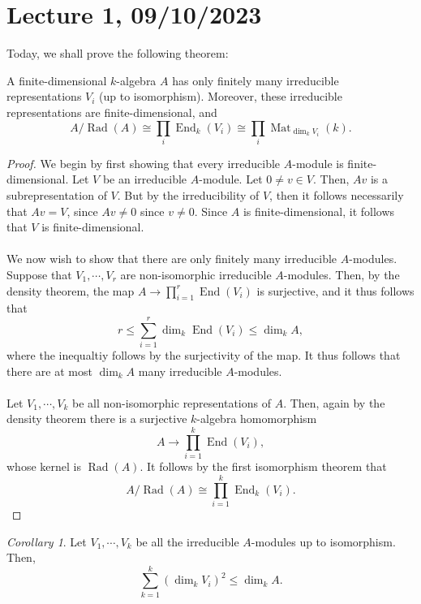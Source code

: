 \documentclass[a4paper]{report}
\theoremstyle{definition}
\theoremstyle{remark}
\theoremstyle{proposition}
\theoremstyle{conjecture}
\theoremstyle{lemma}
\theoremstyle{corollary}
\newtheorem{corollary}{Corollary}
\theoremstyle{exercise}
\theoremstyle{example}
\newcommand{\on}{\operatorname}
\begin{document}
\section{Lecture 1, 09/10/2023}

Today, we shall prove the following theorem:

\begin{theorem}\label{thm25}
    A finite-dimensional $k$-algebra $A$ has only finitely many 
    irreducible representations $V_i$ (up to isomorphism).
    Moreover, these irreducible representations are finite-dimensional,
    and $$A/\on{Rad}(A) \cong \prod_i \on{End}_k(V_i) \cong \prod_i \on{Mat}_{\dim_k V_i}(k).$$
\end{theorem}

\begin{proof}
    We begin by first showing that every irreducible $A$-module is 
    finite-dimensional. Let $V$ be an irreducible $A$-module. 
    Let $0\neq v \in V$. Then, $Av$ is a subrepresentation of 
    $V$. But by the irreducibility of $V$, then it follows necessarily
    that $Av=V$, since $Av\neq 0$ since $v\neq 0$. Since $A$ is 
    finite-dimensional, it follows that $V$ is finite-dimensional. \\\\
    We now wish to show that there are only finitely many irreducible 
    $A$-modules. Suppose that $V_1,\cdots,V_r$ are 
    non-isomorphic irreducible $A$-modules. Then, by the density theorem, 
    the map $A \to \prod_{i=1}^r \on{End}(V_i)$ is surjective, 
    and it thus follows that $$r \leq \sum_{i=1}^r \dim_k \on{End}(V_i)\leq \dim_kA,$$
    where the inequaltiy follows by the surjectivity of the map. It thus 
    follows that there are at most $\dim_kA$ many irreducible $A$-modules.\\\\
    Let $V_1,\cdots,V_k$ be all non-isomorphic representations of $A$.
    Then, again by the density theorem there is a surjective $k$-algebra 
    homomorphism
    $$A \longrightarrow \prod_{i=1}^k \on{End}(V_i),$$
    whose kernel is $\on{Rad}(A)$. It follows by the first isomorphism
    theorem that 
    $$A/\on{Rad}(A) \cong \prod_{i=1}^k\on{End}_k(V_i).$$
\end{proof}

\begin{corollary}
    Let $V_1,\cdots,V_k$ be all the irreducible $A$-modules up to isomorphism.
    Then,
    $$\sum_{k=1}^k (\dim_kV_i)^2 \leq \dim_kA.$$
\end{corollary}
\end{document}
